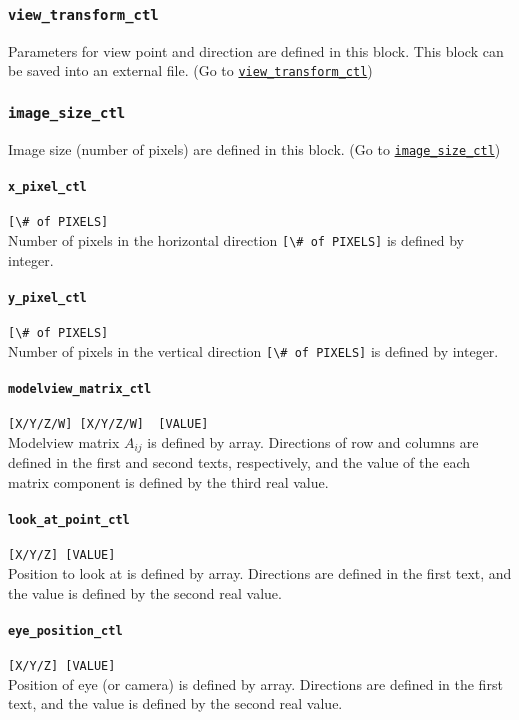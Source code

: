 \subsubsection{\tt view\_transform\_ctl}
\label{href_t:view_transform_ctl}
Parameters for view point and direction are defined in this block. This block can be saved into an external file. (Go to \hyperref[href_i:view_transform_ctl] {\tt view\_transform\_ctl})

\subsubsection*{\tt image\_size\_ctl}
\label{href_t:image_size_ctl}
Image size (number of pixels) are defined in this block. (Go to \hyperref[href_i:image_size_ctl] {\tt image\_size\_ctl})
%
\paragraph{\tt x\_pixel\_ctl}
\label{href_t:x_pixel_ctl}  
\verb|[\# of PIXELS]| \\
Number of pixels in the horizontal direction \verb|[\# of PIXELS]| is defined by integer.
%
\paragraph{\tt y\_pixel\_ctl}
\label{href_t:y_pixel_ctl}  
\verb|[\# of PIXELS]| \\
Number of pixels in the vertical direction \verb|[\# of PIXELS]| is defined by integer.
%
\paragraph{\tt modelview\_matrix\_ctl}
\label{href_t:modelview_matrix_ctl}  
\verb|[X/Y/Z/W] [X/Y/Z/W]  [VALUE]| \\
Modelview matrix $A_{ij}$ is defined by array. Directions of row and columns are defined in the first and second texts, respectively, and the value of the each matrix component is defined by the third real value.
%
\paragraph{\tt look\_at\_point\_ctl}
\label{href_t:look_at_point_ctl}  
\verb|[X/Y/Z] [VALUE]| \\
Position to look at is defined by array. Directions are defined in the first text, and the value is defined by the second real value.
%
\paragraph{\tt eye\_position\_ctl}
\label{href_t:eye_position_ctl}  
\verb|[X/Y/Z] [VALUE]| \\
Position of eye (or camera) is defined by array. Directions are defined in the first text, and the value is defined by the second real value.
%
